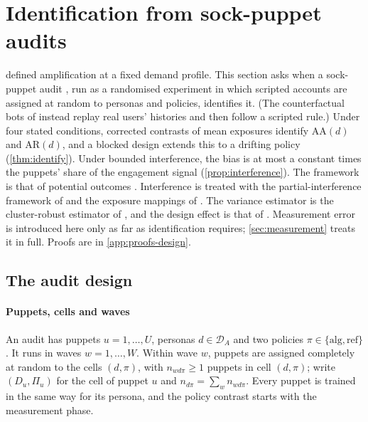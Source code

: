 \providecommand{\Se}{\mathrm{Se}}
\providecommand{\Sp}{\mathrm{Sp}}

\section{Identification from sock-puppet audits}\label{sec:identification}

 defined amplification at a fixed demand profile. This section asks when a sock-puppet audit \citep{sandvig2014}, run as a randomised experiment in which scripted accounts are assigned at random to personas and policies, identifies it. (The counterfactual bots of \citet{hosseinmardi2024} instead replay real users' histories and then follow a scripted rule.) Under four stated conditions, corrected contrasts of mean exposures identify $\mathrm{AA}(d)$ and $\mathrm{AR}(d)$, and a blocked design extends this to a drifting policy (\cref{thm:identify}). Under bounded interference, the bias is at most a constant times the puppets' share of the engagement signal (\cref{prop:interference}).
The framework is that of potential outcomes \citep{rubin1974,imbensrubin2015}. Interference is treated with the partial-interference framework of \citet{hudgens2008} and the exposure mappings of \citet{aronow2017}. The variance estimator is the cluster-robust estimator of \citet{liang1986}, and the design effect is that of \citet{kish1965}. Measurement error is introduced here only as far as identification requires; \cref{sec:measurement} treats it in full. Proofs are in \cref{app:proofs-design}.

\subsection{The audit design}\label{sec:id-design}

\paragraph{Puppets, cells and waves}
An audit has puppets $u=1,\dots,U$, personas $d\in\mathcal D_A$ and two policies $\pi\in\{\mathrm{alg},\mathrm{ref}\}$. It runs in waves $w=1,\dots,W$. Within wave $w$, puppets are assigned completely at random to the cells $(d,\pi)$, with $n_{wd\pi}\ge1$ puppets in cell $(d,\pi)$; write $(D_u,\Pi_u)$ for the cell of puppet $u$ and $n_{d\pi}=\sum_wn_{wd\pi}$. Every puppet is trained in the same way for its persona, and the policy contrast starts with the measurement phase.

